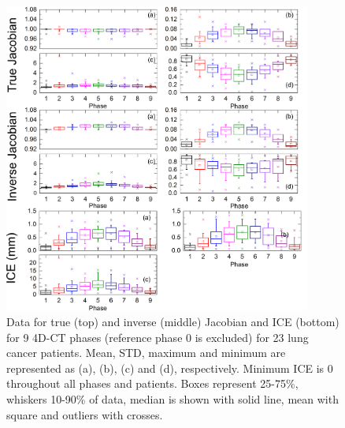 \documentclass[type=dr, dr=rernat, accentcolor=tud7b,colorbacktitle, bigchapter, openright, twoside, 12pt ]{tudthesis}
\begin{document}
\newpage

\begin{figure}[H]
	\begin{center}		
		\includegraphics[width=0.9\textwidth]{./Images/Jacobian_data.png}
		\caption{Data for true (top) and inverse (middle) Jacobian and ICE (bottom) for 9 4D-CT phases (reference phase 0 is excluded) for 23 lung cancer patients. Mean, STD, maximum and minimum are represented as (a), (b), (c) and (d), respectively.
		Minimum ICE is 0 throughout all phases and patients. Boxes represent 25-75\%, whiskers 10-90\% of data, median is shown with solid line, mean with square and outliers with crosses.}
		\label{jacobian_data}
	\end{center}
\end{figure}

\newpage

\end{document}
